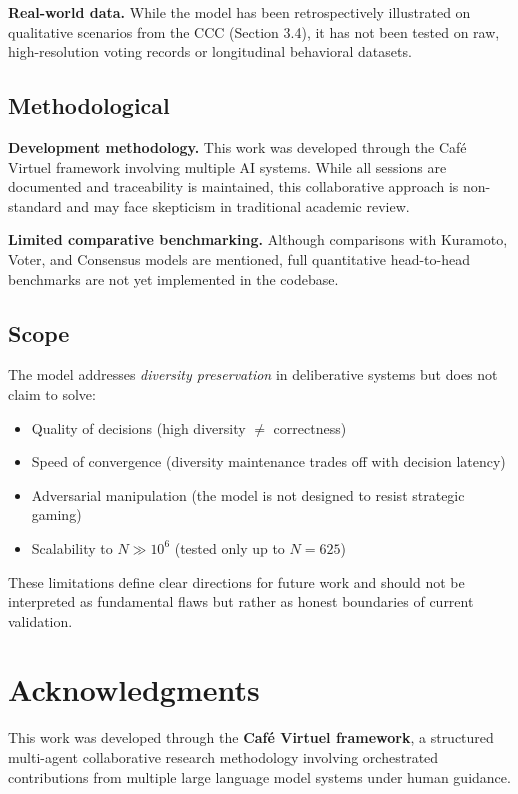 \documentclass[11pt]{article}
\begin{document}
\textbf{Real-world data.} While the model has been retrospectively illustrated on qualitative scenarios from the CCC (Section 3.4), it has not been tested on raw, high-resolution voting records or longitudinal behavioral datasets. 

\subsection{Methodological}

\textbf{Development methodology.} This work was developed through the Café Virtuel framework involving multiple AI systems. While all sessions are documented and traceability is maintained, this collaborative approach is non-standard and may face skepticism in traditional academic review.

\textbf{Limited comparative benchmarking.} Although comparisons with Kuramoto, Voter, and Consensus models are mentioned, full quantitative head-to-head benchmarks are not yet implemented in the codebase.

\subsection{Scope}

The model addresses \emph{diversity preservation} in deliberative systems but does not claim to solve:
\begin{itemize}
    \item Quality of decisions (high diversity $\neq$ correctness)
    \item Speed of convergence (diversity maintenance trades off with decision latency)
    \item Adversarial manipulation (the model is not designed to resist strategic gaming)
    \item Scalability to $N \gg 10^6$ (tested only up to $N=625$)
\end{itemize}

These limitations define clear directions for future work and should not be interpreted as fundamental flaws but rather as honest boundaries of current validation.

\section*{Acknowledgments}

This work was developed through the \textbf{Café Virtuel framework}, a structured multi-agent collaborative research methodology involving orchestrated contributions from multiple large language model systems under human guidance.
\end{document}
